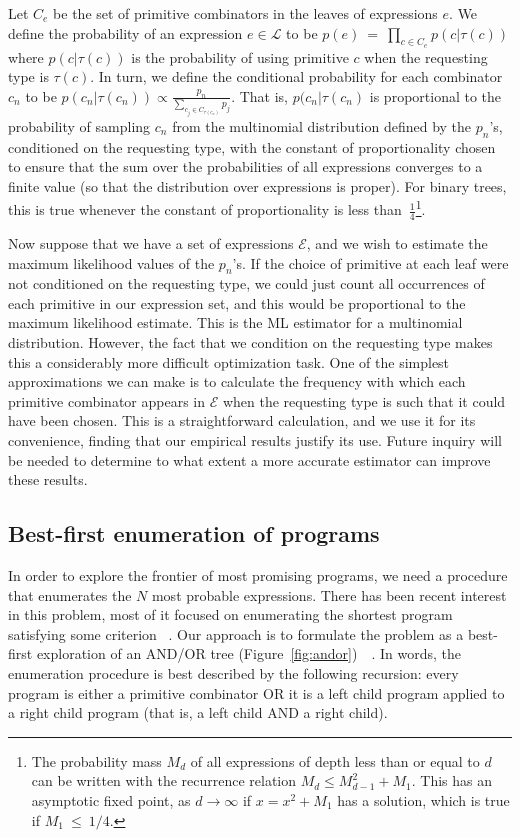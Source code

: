 \documentclass{article}
\begin{document}
Let $C_e$ be the set of primitive combinators in the leaves of
expressions $e$. We define the probability of an expression ${e \in
  \mathcal{L}}$ to be ${ p(e)~=~\prod_{c \in C_e} p(c | \tau(c)) }$
where $p(c | \tau(c))$ is the probability of using primitive $c$ when
the requesting type is $\tau(c)$. In turn, we define the conditional
probability for each combinator $c_n$ to be $p(c_n| \tau(c_n)) \propto
\frac{p_n}{\sum_{c_j \in C_{\tau(c_n)}} p_j}$.  That is, $p(c_n | \tau(c_n)$ is
proportional to the probability of sampling $c_n$ from the multinomial
distribution defined by the $p_n$'s, conditioned on the requesting
type, with the constant of proportionality chosen to ensure that the
sum over the probabilities of all expressions converges to a finite
value (so that the distribution over expressions is proper). For
binary trees, this is true whenever the constant of proportionality is
less than~$\frac{1}{4}$\footnote{The probability mass $M_d$ of all
  expressions of depth less than or equal to $d$ can be written with
  the recurrence relation $M_d \leq M_{d-1}^2 + M_1$. This has an
  asymptotic fixed point, as $d \rightarrow \infty$ if $x = x^2 + M_1$
  has a solution, which is true if $M_1~\leq~1/4$.}.

Now suppose that we have a set of expressions $\mathcal{E}$, and we
wish to estimate the maximum likelihood values of the $p_n$'s. If the
choice of primitive at each leaf were not conditioned on the
requesting type, we could just count all occurrences of each primitive
in our expression set, and this would be proportional to the maximum
likelihood estimate. This is the ML estimator for a multinomial
distribution. However, the fact that we condition on the requesting
type makes this a considerably more difficult optimization task. One
of the simplest approximations we can make is to calculate the
frequency with which each primitive combinator appears in
$\mathcal{E}$ when the requesting type is such that it could have
been chosen. This is a straightforward calculation, and
we use it for its convenience, finding that our empirical results
justify its use. Future inquiry will be needed to determine to what
extent a more accurate estimator can improve these results.

\subsection{Best-first enumeration of programs}
In order to explore the frontier of most promising programs, we need a
procedure that enumerates the $N$ most probable expressions. There has
been recent interest in this problem, most of it focused on
enumerating the shortest program satisfying some
criterion~\cite{DBLP:conf/sfp/Katayama05}
\cite{DBLP:conf/aaip/YakushevJ09}. Our approach is to formulate the
problem as a best-first exploration of an AND/OR tree
(Figure~\ref{fig:andor})~\cite{nilsson1982principles}~\cite{DBLP:journals/cacm/Hall73}. In
words, the enumeration procedure is best described by the following
recursion: every program is either a primitive combinator OR it is a
left child program applied to a right child program (that is, a left
child AND a right child).
\end{document}
